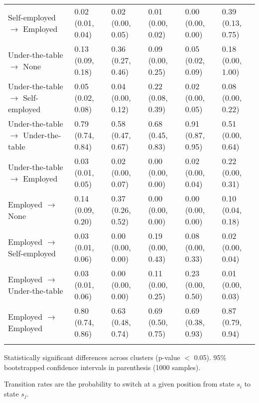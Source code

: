 \begin{table}[htp]
\begin{threeparttable}
\begin{tabular}{llllll}
  \quad Self-employed $\rightarrow$ Employed & 0.02 (0.01, 0.04) & 0.02 (0.00, 0.05) & 0.01 (0.00, 0.02) & 0.00 (0.00, 0.00) & 0.39 (0.13, 0.75) \\ 
   \addlinespace[12pt] 
\quad Under-the-table $\rightarrow$ None & 0.13 (0.09, 0.18) & 0.36 (0.27, 0.46) & 0.09 (0.00, 0.25) & 0.05 (0.02, 0.09) & 0.18 (0.00, 1.00) \\ 
  \quad Under-the-table $\rightarrow$ Self-employed & 0.05 (0.02, 0.08) & 0.04 (0.00, 0.12) & 0.22 (0.08, 0.39) & 0.02 (0.00, 0.05) & 0.08 (0.00, 0.22) \\ 
  \quad Under-the-table $\rightarrow$ Under-the-table & 0.79 (0.74, 0.84) & 0.58 (0.47, 0.67) & 0.68 (0.45, 0.83) & 0.91 (0.87, 0.95) & 0.51 (0.00, 0.64) \\ 
  \quad Under-the-table $\rightarrow$ Employed & 0.03 (0.01, 0.05) & 0.02 (0.00, 0.07) & 0.00 (0.00, 0.00) & 0.02 (0.00, 0.04) & 0.22 (0.00, 0.31) \\ 
   \addlinespace[12pt] 
\quad Employed $\rightarrow$ None & 0.14 (0.09, 0.20) & 0.37 (0.26, 0.52) & 0.00 (0.00, 0.00) & 0.00 (0.00, 0.00) & 0.10 (0.04, 0.18) \\ 
  \quad Employed $\rightarrow$ Self-employed & 0.03 (0.01, 0.06) & 0.00 (0.00, 0.00) & 0.19 (0.00, 0.43) & 0.08 (0.00, 0.33) & 0.02 (0.00, 0.04) \\ 
  \quad Employed $\rightarrow$ Under-the-table & 0.03 (0.01, 0.06) & 0.00 (0.00, 0.00) & 0.11 (0.00, 0.25) & 0.23 (0.00, 0.50) & 0.01 (0.00, 0.03) \\ 
  \quad Employed $\rightarrow$ Employed & 0.80 (0.74, 0.86) & 0.63 (0.48, 0.74) & 0.69 (0.50, 0.75) & 0.69 (0.38, 0.93) & 0.87 (0.79, 0.94) \\ 
  \addlinespace
\addlinespace
\addlinespace
\hline
\addlinespace
\end{tabular}
\begin{tablenotes}
\scriptsize
    \item * Statistically significant differences across clusters (p-value $<$ 0.05). 95\% bootstrapped confidence intervals in parenthesis (1000 samples).
    \item Transition rates are the probability to switch at a given position from state $s_i$ to state $s_j$.
\end{tablenotes}
\end{threeparttable}
\end{table}
